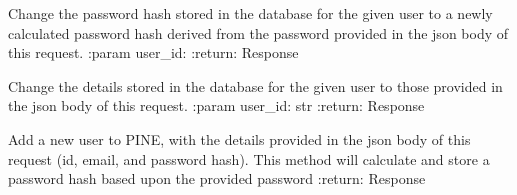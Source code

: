 \documentclass[letterpaper,10pt,english]{sphinxmanual}
\begin{document}

\begin{fulllineitems}
\label{\detokenize{autoapi/pine/backend/admin/bp/index:pine.backend.admin.bp.update_user_password}}
\sphinxAtStartPar
Change the password hash stored in the database for the given user to a newly calculated password hash derived from
the password provided in the json body of this request.
:param user\_id:
:return: Response

\end{fulllineitems}


\begin{fulllineitems}
\label{\detokenize{autoapi/pine/backend/admin/bp/index:pine.backend.admin.bp.update_user}}
\sphinxAtStartPar
Change the details stored in the database for the given user to those provided in the json body of this request.
:param user\_id: str
:return: Response

\end{fulllineitems}


\begin{fulllineitems}
\label{\detokenize{autoapi/pine/backend/admin/bp/index:pine.backend.admin.bp.add_user}}
\sphinxAtStartPar
Add a new user to PINE, with the details provided in the json body of this request (id, email, and password hash).
This method will calculate and store a password hash based upon the provided password
:return: Response

\end{fulllineitems}

\end{document}
